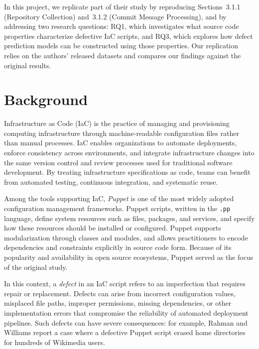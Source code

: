 \documentclass[conference]{IEEEtran}
\begin{document}
	In this project, we replicate part of their study by reproducing Sections~3.1.1 
	(Repository Collection) and~3.1.2 (Commit Message Processing), 
	and by addressing two research questions: RQ1, which investigates 
	what source code properties characterize defective IaC scripts, 
	and RQ3, which explores how defect prediction models can be constructed 
	using those properties. Our replication relies on the authors’ released datasets 
	and compares our findings against the original results.
	
	\section{Background}
	Infrastructure as Code (IaC) is the practice of managing and provisioning computing infrastructure through machine-readable configuration files rather than manual processes. IaC enables organizations to automate deployments, enforce consistency across environments, and integrate infrastructure changes into the same version control and review processes used for traditional software development. By treating infrastructure specifications as code, teams can benefit from automated testing, continuous integration, and systematic reuse.
	
	Among the tools supporting IaC, \textit{Puppet} is one of the most widely adopted configuration management frameworks. Puppet scripts, written in the \texttt{.pp} language, define system resources such as files, packages, and services, and specify how these resources should be installed or configured. Puppet supports modularization through classes and modules, and allows practitioners to encode dependencies and constraints explicitly in source code form. Because of its popularity and availability in open source ecosystems, Puppet served as the focus of the original study.
	
	In this context, a \textit{defect} in an IaC script refers to an imperfection that requires repair or replacement. Defects can arise from incorrect configuration values, misplaced file paths, improper permissions, missing dependencies, or other implementation errors that compromise the reliability of automated deployment pipelines. Such defects can have severe consequences: for example, Rahman and Williams report a case where a defective Puppet script erased home directories for hundreds of Wikimedia users.
	
\end{document}
